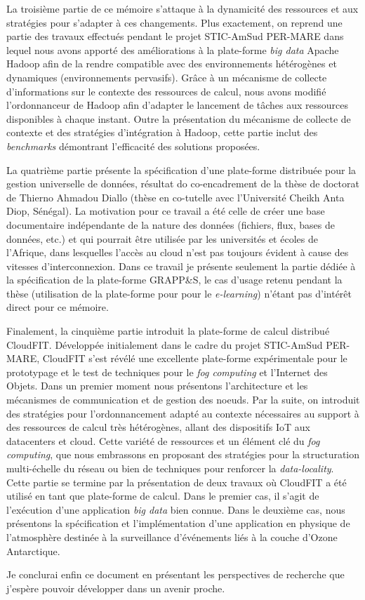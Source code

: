 La troisième partie de ce mémoire s'attaque à la dynamicité des ressources et aux stratégies pour s'adapter à ces changements. Plus exactement, on reprend une partie des travaux effectués pendant le projet STIC-AmSud PER-MARE dans lequel nous avons apporté des améliorations à la plate-forme \textit{big data} Apache Hadoop afin de la rendre compatible avec des environnements hétérogènes et dynamiques (environnements pervasifs). Grâce à un mécanisme de collecte d'informations sur le contexte des ressources de calcul, nous avons modifié l'ordonnanceur de Hadoop afin d'adapter le lancement de tâches aux ressources disponibles à chaque instant. Outre la présentation du mécanisme de collecte de contexte et des stratégies d'intégration à Hadoop, cette partie inclut des \textit{benchmarks} démontrant l'efficacité des solutions proposées. 

La quatrième partie présente la spécification d'une plate-forme distribuée pour la gestion universelle de données, résultat do co-encadrement de la thèse de doctorat de Thierno Ahmadou Diallo (thèse en co-tutelle avec l'Université Cheikh Anta Diop, Sénégal). La motivation pour ce travail a été celle de créer une base documentaire indépendante de la nature des données (fichiers, flux, bases de données, etc.) et qui pourrait être utilisée par les universités et écoles de l'Afrique, dans lesquelles l'accès au cloud n'est pas toujours évident à cause des vitesses d'interconnexion. Dans ce travail je présente seulement la partie dédiée à la spécification de la plate-forme GRAPP\&S, le cas d'usage retenu pendant la thèse (utilisation de la plate-forme pour pour le \textit{e-learning}) n'étant pas d'intérêt direct pour ce mémoire. 

Finalement, la cinquième partie introduit la plate-forme de calcul distribué CloudFIT. Développée initialement dans le cadre du projet STIC-AmSud PER-MARE, CloudFIT s'est révélé une excellente plate-forme expérimentale pour le prototypage et le test de techniques pour le \textit{fog computing} et l'Internet des Objets. Dans un premier moment nous présentons l'architecture et les mécanismes de communication et de gestion des n{oe}uds. Par la suite, on introduit des stratégies pour l'ordonnancement adapté au contexte nécessaires au support à des ressources de calcul très hétérogènes, allant des dispositifs IoT aux datacenters et cloud. Cette variété de ressources et un élément clé du \textit{fog computing}, que nous embrassons en proposant des stratégies pour la structuration multi-échelle du réseau ou bien de techniques pour renforcer la \textit{data-locality}. Cette partie se termine par la présentation de deux travaux où CloudFIT a été utilisé en tant que plate-forme de calcul. Dans le premier cas, il s'agit de l'exécution d'une application \textit{big data} bien connue. Dans le deuxième cas, nous présentons la spécification et l'implémentation d'une application en physique de l'atmosphère destinée à la surveillance d'événements liés à la couche d'Ozone Antarctique. 

Je conclurai enfin ce document en présentant les perspectives de recherche que j'espère pouvoir développer dans un avenir proche.


 

